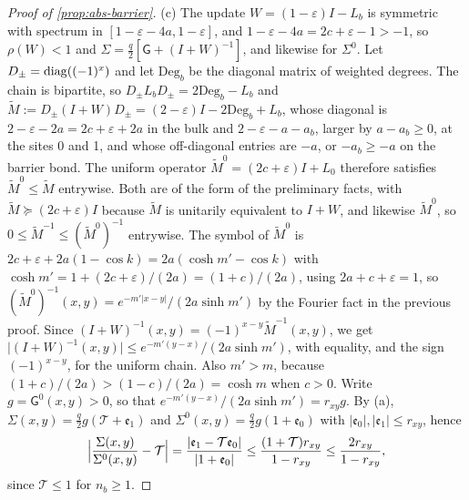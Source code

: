 \begin{proof}[Proof of \cref{prop:abs-barrier}]
(c) The update $W=(1-\varepsilon)I-L_b$ is symmetric with spectrum in $[1-\varepsilon-4a,1-\varepsilon]$, and $1-\varepsilon-4a=2c+\varepsilon-1>-1$, so $\rho(W)<1$ and $\Sigma=\frac q2[\mathsf G+(I+W)^{-1}]$, and likewise for $\Sigma^0$. Let $D_\pm=\operatorname{diag}((-1)^x)$ and let $\mathrm{Deg}_b$ be the diagonal matrix of weighted degrees. The chain is bipartite, so $D_\pm L_bD_\pm=2\mathrm{Deg}_b-L_b$ and $\tilde M:=D_\pm(I+W)D_\pm=(2-\varepsilon)I-2\mathrm{Deg}_b+L_b$, whose diagonal is $2-\varepsilon-2a=2c+\varepsilon+2a$ in the bulk and $2-\varepsilon-a-a_b$, larger by $a-a_b\ge0$, at the sites 0 and 1, and whose off-diagonal entries are $-a$, or $-a_b\ge-a$ on the barrier bond. The uniform operator $\tilde M^0=(2c+\varepsilon)I+L_0$ therefore satisfies $\tilde M^0\le\tilde M$ entrywise. Both are of the form of the preliminary facts, with $\tilde M\succeq(2c+\varepsilon)I$ because $\tilde M$ is unitarily equivalent to $I+W$, and likewise $\tilde M^0$, so $0\le\tilde M^{-1}\le(\tilde M^0)^{-1}$ entrywise. The symbol of $\tilde M^0$ is $2c+\varepsilon+2a(1-\cos k)=2a(\cosh m'-\cos k)$ with $\cosh m'=1+(2c+\varepsilon)/(2a)=(1+c)/(2a)$, using $2a+c+\varepsilon=1$, so $(\tilde M^0)^{-1}(x,y)=e^{-m'\lvert x-y\rvert}/(2a\sinh m')$ by the Fourier fact in the previous proof. Since $(I+W)^{-1}(x,y)=(-1)^{x-y}\tilde M^{-1}(x,y)$, we get $\lvert(I+W)^{-1}(x,y)\rvert\le e^{-m'(y-x)}/(2a\sinh m')$, with equality, and the sign $(-1)^{x-y}$, for the uniform chain. Also $m'>m$, because $(1+c)/(2a)>(1-c)/(2a)=\cosh m$ when $c>0$. Write $g=\mathsf G^0(x,y)>0$, so that $e^{-m'(y-x)}/(2a\sinh m')=r_{xy}g$. By (a), $\Sigma(x,y)=\frac q2g(\mathcal T+\mathfrak e_1)$ and $\Sigma^0(x,y)=\frac q2g(1+\mathfrak e_0)$ with $\lvert\mathfrak e_0\rvert,\lvert\mathfrak e_1\rvert\le r_{xy}$, hence
\[
\Bigl\lvert\frac{\Sigma(x,y)}{\Sigma^0(x,y)}-\mathcal T\Bigr\rvert=\frac{\lvert\mathfrak e_1-\mathcal T\mathfrak e_0\rvert}{\lvert1+\mathfrak e_0\rvert}\le\frac{(1+\mathcal T)r_{xy}}{1-r_{xy}}\le\frac{2r_{xy}}{1-r_{xy}},
\]
since $\mathcal T\le1$ for $n_b\ge1$.
\end{proof}


